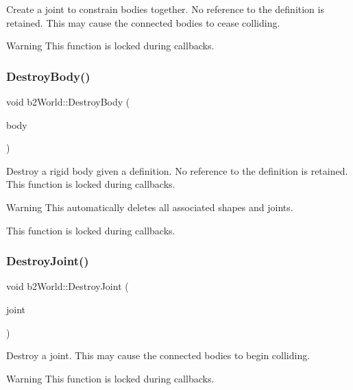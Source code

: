 Create a joint to constrain bodies together. No reference to the definition is retained. This may cause the connected bodies to cease colliding. \begin{DoxyWarning}{Warning}
This function is locked during callbacks. 
\end{DoxyWarning}
\mbox{\label{classb2World_ad52231ad7a9556ef5735ac79cbcd8fcf}} 
\subsubsection{\texorpdfstring{Destroy\+Body()}{DestroyBody()}}
{\footnotesize\ttfamily void b2\+World\+::\+Destroy\+Body (\begin{DoxyParamCaption}\item[{\mbox{\hyperlink{classb2Body}{b2\+Body}} $\ast$}]{body }\end{DoxyParamCaption})}

Destroy a rigid body given a definition. No reference to the definition is retained. This function is locked during callbacks. \begin{DoxyWarning}{Warning}
This automatically deletes all associated shapes and joints. 

This function is locked during callbacks. 
\end{DoxyWarning}
\mbox{\label{classb2World_add5942aef171e54cfa384c8975746dca}} 
\subsubsection{\texorpdfstring{Destroy\+Joint()}{DestroyJoint()}}
{\footnotesize\ttfamily void b2\+World\+::\+Destroy\+Joint (\begin{DoxyParamCaption}\item[{\mbox{\hyperlink{classb2Joint}{b2\+Joint}} $\ast$}]{joint }\end{DoxyParamCaption})}

Destroy a joint. This may cause the connected bodies to begin colliding. \begin{DoxyWarning}{Warning}
This function is locked during callbacks. 
\end{DoxyWarning}
\mbox{\label{classb2World_a73c1fec260d460514edd335d4c235893}} 

